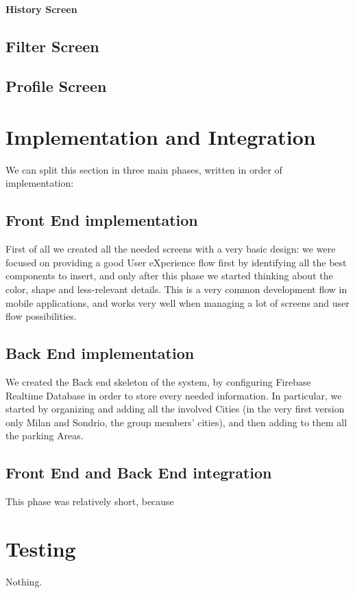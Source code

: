 \documentclass[11pt]{article} %
\begin{document}
\paragraph{History Screen}
\subsection{Filter Screen}
\subsection{Profile Screen}

\section{Implementation and Integration}
We can split this section in three main phases, written in order of implementation: 

\subsection{Front End implementation}
First of all we created all the needed screens with a very basic design: we were focused on providing a good User eXperience flow first by identifying all the best components to insert, and only after this phase we started thinking about the color, shape and less-relevant details. This is a very common development flow in mobile applications, and works very well when managing a lot of screens and user flow possibilities.   
\subsection{Back End implementation}
We created the Back end skeleton of the system, by configuring Firebase Realtime Database in order to store every needed information. In particular, we started by organizing and adding all the involved Cities (in the very first version only Milan and Sondrio, the group members' cities), and then adding to them all the parking Areas. 
\subsection{Front End and Back End integration}
This phase was relatively short, because 

\section{Testing}
Nothing.
\end{document}

